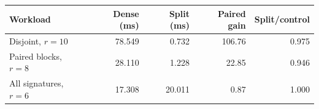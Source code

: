 \begin{tabular}{@{}lrrrr@{}}
\toprule
Workload & Dense (ms) & Split (ms) & Paired gain & Split/control\\
\midrule
Disjoint, $r=10$ & 78.549 & 0.732 & 106.76 & 0.975\\
Paired blocks, $r=8$ & 28.110 & 1.228 & 22.85 & 0.946\\
All signatures, $r=6$ & 17.308 & 20.011 & 0.87 & 1.000\\
\bottomrule
\end{tabular}
